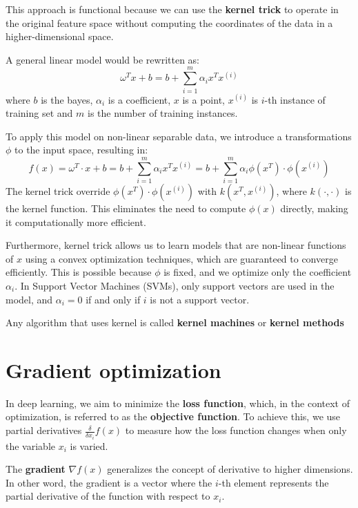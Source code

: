 This approach is functional because we can use the \textbf{kernel trick} to operate
in the original feature space without computing the coordinates of the data in a
higher-dimensional space.

A general linear model would be rewritten as:
\begin{equation}
    \omega^T x + b = b+ \sum_{i=1}^m \alpha_ix^Tx^{(i)}
\end{equation}
where $b$ is the bayes, $\alpha_i$ is a coefficient, $x$ is a point, $x^{(i)}$ is
$i$-th instance of training set and $m$ is the number of training instances.

To apply this model on non-linear separable data, we introduce a transformations
$\phi$ to the input space, resulting in:
\begin{equation}
    f(x) = \omega^T \cdot x + b = b + \sum_{i = 1}^m \alpha_ix^Tx^{(i)} = b +
    \sum_{i=1}^m \alpha_i\phi (x^T) \cdot \phi(x^{(i)})
\end{equation}
The kernel trick override $\phi(x^T) \cdot \phi(x^{(i)})$ with $k(x^T, x^{(i)})$,
where $k(\cdot , \cdot)$ is the kernel function. This eliminates the need to
compute $\phi(x)$ directly, making it computationally more efficient.

Furthermore, kernel trick allows us to learn models that are non-linear functions
of $x$ using a convex optimization techniques, which are guaranteed to converge
efficiently. This is possible because $\phi $ is fixed, and we optimize only the
coefficient $\alpha_i$. In Support Vector Machines (SVMs), only support vectors
are used in the model, and $\alpha_i= 0$ if and only if $i$ is not a support vector.

Any algorithm that uses kernel is called \textbf{kernel machines} or \textbf{kernel
    methods}
\section{Gradient optimization}
In deep learning, we aim to minimize the \textbf{loss function}, which, in the
context of optimization, is referred to as the \textbf{objective function}. To
achieve this, we use partial derivatives $\frac{\delta}{\delta x_i} f(x)$ to
measure how the loss function changes when only the variable $x_i$ is varied.

The \textbf{gradient} $\nabla f(x)$ generalizes the concept of derivative to
higher dimensions. In other word, the gradient is a vector where the $i$-th element
represents the partial derivative of the function with respect to $x_i$.

